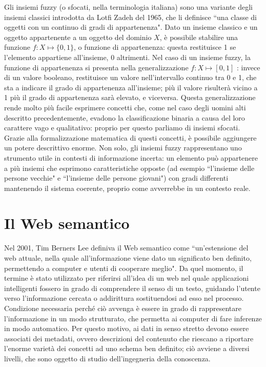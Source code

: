 \documentclass[12pt,a4paper]{report}
\begin{document}
Gli insiemi fuzzy (o sfocati, nella terminologia italiana) sono una variante degli insiemi classici introdotta da Lotfi Zadeh del 1965, che li definisce ``una classe di oggetti con un continuo di gradi di appartenenza"\cite{fuzzysetspaper}.
Dato un insieme classico e un oggetto appartenente a un oggetto del dominio $X$, è possibile stabilire una funzione  $f: X \mapsto \{0,1\}$, o funzione di appartenenza: questa restituisce 1 se l'elemento appartiene all'insieme, 0 altrimenti.
Nel caso di un insieme fuzzy, la funzione di appartenenza si presenta nella generalizzazione  $f: X \mapsto [0,1]$ : invece di un valore booleano, restituisce un valore nell'intervallo continuo tra 0 e 1, che sta a indicare il grado di appartenenza all'insieme; più il valore risulterà vicino a 1 più il grado di appartenenza sarà elevato, e viceversa.
Questa generalizzazione rende molto più facile esprimere concetti che, come nel caso degli uomini alti descritto precedentemente, evadono la classificazione binaria a causa del loro carattere vago e qualitativo: proprio per questo parliamo di insiemi sfocati. Grazie alla formalizzazione matematica di questi concetti, è possibile aggiungere un potere descrittivo enorme. Non solo, gli insiemi fuzzy rappresentano uno strumento utile in contesti di informazione incerta: un elemento può appartenere a più insiemi che esprimono caratteristiche opposte (ad esempio ``l'insieme delle persone vecchie" e ``l'insieme delle persone giovani"\cite{fuzzysystemspaper}) con gradi differenti mantenendo il sistema coerente, proprio come avverrebbe in un contesto reale.


\section{Il Web semantico}
Nel 2001, Tim Berners Lee definiva il Web semantico come ``un'estensione del web attuale, nella quale all'informazione viene dato un significato ben definito, permettendo a computer e utenti di cooperare meglio"\cite{semanticWebPaper}.
Da quel momento, il termine è stato utilizzato per riferirsi all'idea di un web nel quale applicazioni intelligenti fossero in grado di comprendere il senso di un testo, guidando l'utente verso l'informazione cercata o addirittura sostituendosi ad esso nel processo.
Condizione necessaria perché ciò avvenga è essere in grado di rappresentare l'informazione in un modo strutturato, che permetta ai computer di fare inferenze in modo automatico. Per questo motivo, ai dati in senso stretto devono essere associati dei metadati, ovvero descrizioni del contenuto che riescano a riportare l'enorme varietà dei concetti ad uno schema ben definito; ciò avviene a diversi livelli, che sono oggetto di studio dell'ingegneria della conoscenza. 
\end{document}
